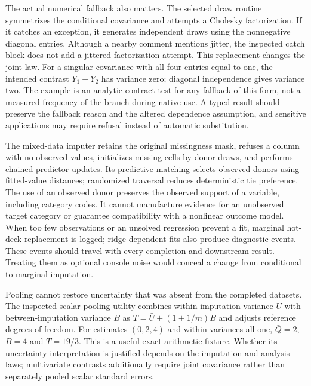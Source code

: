 The actual numerical fallback also matters. The selected draw routine symmetrizes the conditional covariance and attempts a Cholesky factorization. If it catches an exception, it generates independent draws using the nonnegative diagonal entries. Although a nearby comment mentions jitter, the inspected catch block does not add a jittered factorization attempt. This replacement changes the joint law. For a singular covariance with all four entries equal to one, the intended contrast $Y_1-Y_2$ has variance zero; diagonal independence gives variance two. The example is an analytic contract test for any fallback of this form, not a measured frequency of the branch during native use. A typed result should preserve the fallback reason and the altered dependence assumption, and sensitive applications may require refusal instead of automatic substitution.\citep{exec25_jtm_tetrad,exec25_jtm_choice}

The mixed-data imputer retains the original missingness mask, refuses a column with no observed values, initializes missing cells by donor draws, and performs chained predictor updates. Its predictive matching selects observed donors using fitted-value distances; randomized traversal reduces deterministic tie preference. The use of an observed donor preserves the observed support of a variable, including category codes. It cannot manufacture evidence for an unobserved target category or guarantee compatibility with a nonlinear outcome model. When too few observations or an unsolved regression prevent a fit, marginal hot-deck replacement is logged; ridge-dependent fits also produce diagnostic events. These events should travel with every completion and downstream result. Treating them as optional console noise would conceal a change from conditional to marginal imputation.\citep{exec25_jtm_tetrad}

Pooling cannot restore uncertainty that was absent from the completed datasets. The inspected scalar pooling utility combines within-imputation variance $\bar U$ with between-imputation variance $B$ as $T=\bar U+(1+1/m)B$ and adjusts reference degrees of freedom. For estimates $(0,2,4)$ and within variances all one, $\bar Q=2$, $B=4$ and $T=19/3$. This is a useful exact arithmetic fixture. Whether its uncertainty interpretation is justified depends on the imputation and analysis laws; multivariate contrasts additionally require joint covariance rather than separately pooled scalar standard errors.\citep{exec25_jtm_tetrad,exec25_jtm_choice}

